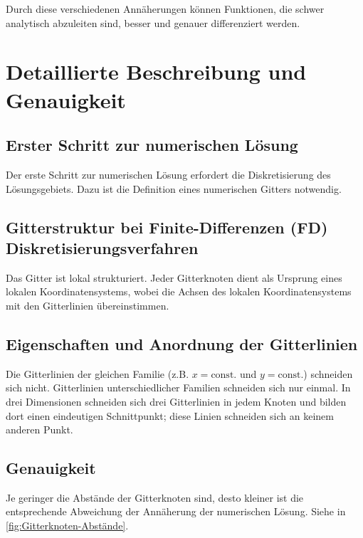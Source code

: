 Durch diese verschiedenen Annäherungen können Funktionen, die schwer analytisch abzuleiten sind, besser und genauer differenziert werden.

\section{Detaillierte Beschreibung und Genauigkeit}


\subsection{Erster Schritt zur numerischen Lösung}

Der erste Schritt zur numerischen Lösung erfordert die Diskretisierung des Lösungsgebiets. Dazu ist die Definition eines numerischen Gitters notwendig.


\subsection{Gitterstruktur bei Finite-Differenzen (FD) Diskretisierungsverfahren}

Das Gitter ist lokal strukturiert. Jeder Gitterknoten dient als Ursprung eines lokalen Koordinatensystems, wobei die Achsen des lokalen Koordinatensystems mit den Gitterlinien übereinstimmen.


\subsection{Eigenschaften und Anordnung der Gitterlinien}

Die Gitterlinien der gleichen Familie (z.B. $x = \text{const.}$ und $y = \text{const.}$) schneiden sich nicht. Gitterlinien unterschiedlicher Familien schneiden sich nur einmal. In drei Dimensionen schneiden sich drei Gitterlinien in jedem Knoten und bilden dort einen eindeutigen Schnittpunkt; diese Linien schneiden sich an keinem anderen Punkt.

\subsection{Genauigkeit}

Je geringer die Abstände der Gitterknoten sind, desto kleiner ist die entsprechende Abweichung der Annäherung der numerischen Lösung. Siehe in \ref{fig:Gitterknoten-Abstände}.

